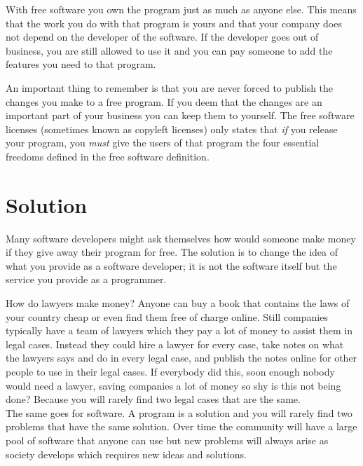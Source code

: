 \documentclass[12pt,a4paper]{article}
\begin{document}
With free software you own the program just as much as anyone else. This means that the work you do with that program is yours and that your company does not depend on the developer of the software. If the developer goes out of business, you are still allowed to use it and you can pay someone to add the features you need to that program.

An important thing to remember is that you are never forced to publish the changes you make to a free program. If you deem that the changes are an important part of your business you can keep them to yourself. The free software licenses (sometimes known as copyleft licenses) only states that \textit{if} you release your program, you \textit{must} give the users of that program the four essential freedoms defined in the free software definition.

\section{Solution}
Many software developers might ask themselves how would someone make money if they give away their program for free. The solution is to change the idea of what you provide as a software developer; it is not the software itself but the service you provide as a programmer.

How do lawyers make money? Anyone can buy a book that contains the laws of your country cheap or even find them free of charge online. Still companies typically have a team of lawyers which they pay a lot of money to assist them in legal cases. Instead they could hire a lawyer for every case, take notes on what the lawyers says and do in every legal case, and publish the notes online for other people to use in their legal cases. If everybody did this, soon enough nobody would need a lawyer, saving companies a lot of money so shy is this not being done? Because you will rarely find two legal cases that are the same.\\
The same goes for software. A program is a solution and you will rarely find two problems that have the same solution. Over time the community will have a large pool of software that anyone can use but new problems will always arise as society develops which requires new ideas and solutions.
\newpage
\appendix
\end{document}
